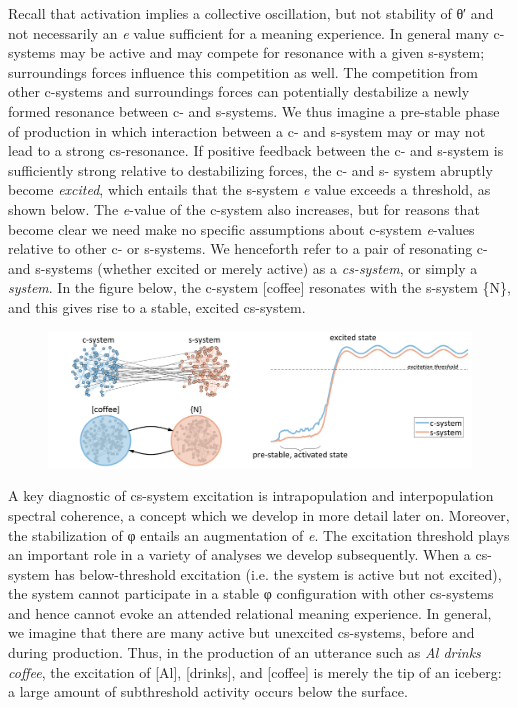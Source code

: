   Recall that activation implies a collective oscillation, but not stability of θ′ and not necessarily an \textit{e} value sufficient for a meaning experience. In general many c-systems may be active and may compete for resonance with a given s-system; surroundings forces influence this competition as well. The competition from other c-systems and surroundings forces can potentially destabilize a newly formed resonance between c- and s-systems. We thus imagine a pre-stable phase of production in which interaction between a c- and s-system may or may not lead to a strong cs-resonance. If positive feedback between the c- and s-system is sufficiently strong relative to destabilizing forces, the c- and s- system abruptly become \textit{excited}, which entails that the s-system \textit{e} value exceeds a threshold, as shown below. The \textit{e}{}-value of the c-system also increases, but for reasons that become clear we need make no specific assumptions about c-system \textit{e}{}-values relative to other c- or s-systems. We henceforth refer to a pair of resonating c- and s-systems (whether excited or merely active) as a \textit{cs-system}, or simply a \textit{system}. In the figure below, the c-system [coffee] resonates with the s-system \{N\}, and this gives rise to a stable, excited cs-system.

  
\begin{figure}
\includegraphics[width=\textwidth]{figures/Tilsen-img17.png}
\caption{\missingcaption}
\label{fig:}
\end{figure}
 

  A key diagnostic of cs-system excitation is intrapopulation and interpopulation spectral coherence, a concept which we develop in more detail later on. Moreover, the stabilization of φ entails an augmentation of \textit{e}. The excitation threshold plays an important role in a variety of analyses we develop subsequently. When a cs-system has below-threshold excitation (i.e. the system is active but not excited), the system cannot participate in a stable φ configuration with other cs-systems and hence cannot evoke an attended relational meaning experience. In general, we imagine that there are many active but unexcited cs-systems, before and during production. Thus, in the production of an utterance such as \textit{Al drinks coffee}, the excitation of [Al], [drinks], and [coffee] is merely the tip of an iceberg: a large amount of subthreshold activity occurs below the surface.

